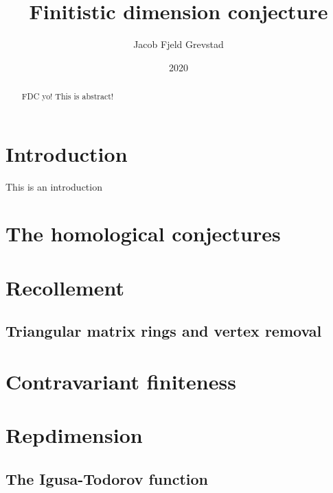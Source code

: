 \documentclass[11pt, a4paper, english]{article}
\theoremstyle{definition}
\begin{document}
\title{Finitistic dimension conjecture}
\author{Jacob Fjeld Grevstad}
\date{2020}
\maketitle
{}

\begin{abstract}
FDC yo! This is abstract!
\end{abstract}
\clearpage

\tableofcontents
\clearpage

\section*{Introduction}
%

This is an introduction

\section{The homological conjectures}


\section{Recollement}


\subsection{Triangular matrix rings and vertex removal}


\section{Contravariant finiteness}


\section{Repdimension}


\subsection{The Igusa-Todorov function} \label{sec:Igusa-Todorov}

\end{document}
